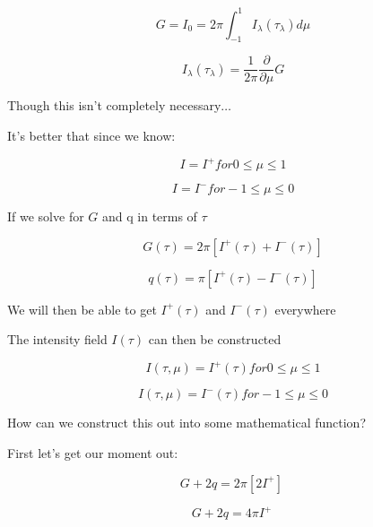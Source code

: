 \documentclass[12pt]{article}
\renewcommand{\_}{\kern-1.5pt\textunderscore\kern-1.5pt}
\begin{document}
\begin{itemize}
 \[ G=I_{0}=2 \pi  \int _{-1}^{1}I_{ \lambda } \left(  \tau_{ \lambda } \right) d \mu  \] \par

 \[ I_{ \lambda } \left(  \tau_{ \lambda } \right) =\frac{1}{2 \pi }\frac{ \partial }{ \partial  \mu }G \] \par

Though this isn’t completely necessary$ \ldots $ \par

It’s better that since we know:\par

 \[ I=I^{+} for 0 \leq  \mu  \leq 1 \] \par

 \[ I=I^{-} for-1 \leq  \mu  \leq 0 \] \par

If we solve for  \( G \)  and q in terms of  \(  \tau \) \par

 \[ G \left(  \tau \right) =2 \pi  \left[ I^{+} \left(  \tau \right) +I^{-} \left(  \tau \right)  \right]  \] \par

 \[ q \left(  \tau \right) = \pi  \left[ I^{+} \left(  \tau \right) -I^{-} \left(  \tau \right)  \right]  \] \par

We will then be able to get  \( I^{+} \left(  \tau \right)  \)  and  \( I^{-} \left(  \tau \right)  \)  everywhere\par

The intensity field  \( I \left(  \tau \right)  \)  can then be constructed\par

 \[ I \left(  \tau, \mu  \right) =I^{+} \left(  \tau \right)  for 0 \leq  \mu  \leq 1 \] \par

 \[ I \left(  \tau, \mu  \right) =I^{-} \left(  \tau \right)  for-1 \leq  \mu  \leq 0 \] \par

How can we construct this out into some mathematical function?\par

First let’s get our moment out:\par

 \[ G+2q=2 \pi  \left[ 2I^{+} \right] ~ \] \par

 \[ G+2q=4 \pi I^{+}~ \] \par


\end{itemize}
\end{document}
